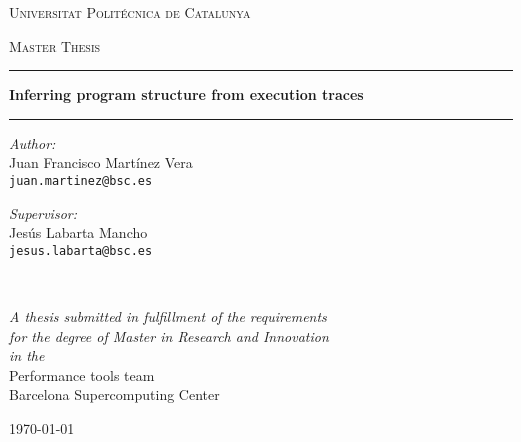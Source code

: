 \documentclass[a4paper,11pt,twoside]{book}
\begin{document}
\frontmatter 
\pagestyle{plain} 


\begin{titlepage}
\begin{center}

\vspace*{.06\textheight}
{\scshape\LARGE Universitat Polit\'ecnica de Catalunya\par}\vspace{1.5cm} %
\textsc{\Large Master Thesis}
\vspace{1.5cm}
\hrule
\vspace{0.4cm}
{\huge \bfseries Inferring program structure from execution traces\par}
\vspace{0.4cm}
\hrule
\vspace{1.5cm}
 
\begin{minipage}[t]{0.4\textwidth}
\begin{flushleft} \large
\emph{Author:}\\
Juan Francisco Mart\'inez Vera \\
{\tt juan.martinez@bsc.es} %
\end{flushleft}
\end{minipage}
\begin{minipage}[t]{0.4\textwidth}
\begin{flushright} \large
\emph{Supervisor:} \\
Jes\'us Labarta Mancho\\
{\tt jesus.labarta@bsc.es} %
\end{flushright}
\end{minipage}\\[3cm]
 
\vfill

\large \textit{A thesis submitted in fulfillment of the requirements\\ for the
degree of Master in Research and Innovation}\\[0.3cm] %
\textit{in the}\\[0.4cm]
Performance tools team\\Barcelona Supercomputing Center\\[2cm] %
 
\vfill

{\large \today}\\[4cm] %
 
\vfill
\end{center}
\end{titlepage}
\end{document}
